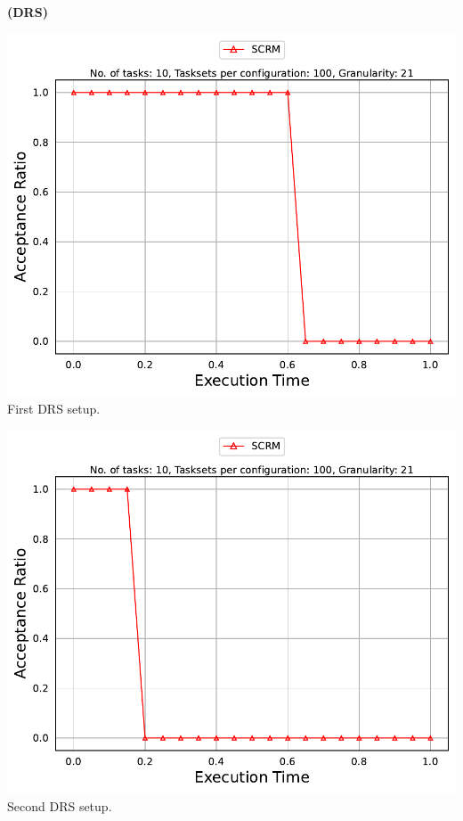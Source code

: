 \documentclass[]{article}
\begin{document}
	\begin{minipage}[t]{0.48\linewidth}
		\centering
		\textbf{(DRS)}
		\vspace{0.3cm}
		
		\includegraphics[width=\linewidth]{SCRM_1st Setup.pdf}
		First DRS setup.
		\vspace{0.3cm}
		
		\includegraphics[width=\linewidth]{SCRM_2nd Setup.pdf}
		Second DRS setup.
		\vspace{0.3cm}


\end{minipage}
\end{document}
